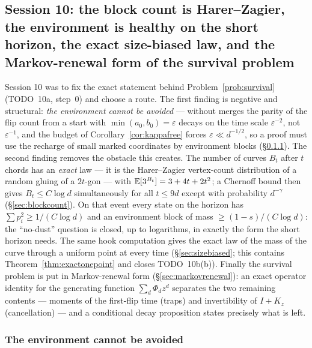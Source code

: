 \subsection{Session 10: the block count is Harer--Zagier, the environment
is healthy on the short horizon, the exact size-biased law, and the
Markov-renewal form of the survival problem}\label{sec:s10}

Session 10 was to fix the exact statement behind
Problem~\ref{prob:survival} (TODO~10a, step~0) and choose a route.  The
first finding is negative and structural: \emph{the environment cannot
be avoided} --- without merges the parity of the flip count from a start
with $\min(a_0,b_0)=\varepsilon$ decays on the time scale
$\varepsilon^{-2}$, not $\varepsilon^{-1}$, and the budget of
Corollary~\ref{cor:kappafree} forces $\varepsilon\ll d^{-1/2}$, so a
proof must use the recharge of small marked coordinates by
environment blocks (\S\ref{sec:noenv}).  The second finding removes the
obstacle this creates.  The number of curves $B_t$ after $t$ chords has
an \emph{exact} law --- it is the Harer--Zagier vertex-count
distribution of a random gluing of a $2t$-gon --- with
$\mathbb{E}[3^{B_t}]=3+4t+2t^2$; a Chernoff bound then gives $B_t\le C\log d$
simultaneously for all $t\le9d$ except with probability $d^{-\gamma}$
(\S\ref{sec:blockcount}).  On that event every state on the horizon
has $\sum p_i^2\ge1/(C\log d)$ and an environment block of mass
$\ge(1-s)/(C\log d)$: the ``no-dust'' question is closed, up to
logarithms, in exactly the form the short horizon needs.  The same hook
computation gives the exact law of the mass of the curve through a
uniform point at every time (\S\ref{sec:sizebiased}; this contains
Theorem~\ref{thm:exactonepoint} and closes TODO~10b(b)).  Finally the
survival problem is put in Markov-renewal form
(\S\ref{sec:markovrenewal}): an exact operator identity for the
generating function $\sum_d\Phi_dz^d$ separates the two remaining
contents --- moments of the first-flip time (traps) and invertibility
of $I+K_z$ (cancellation) --- and a conditional decay proposition
states precisely what is left.

\subsubsection{The environment cannot be avoided}\label{sec:noenv}

